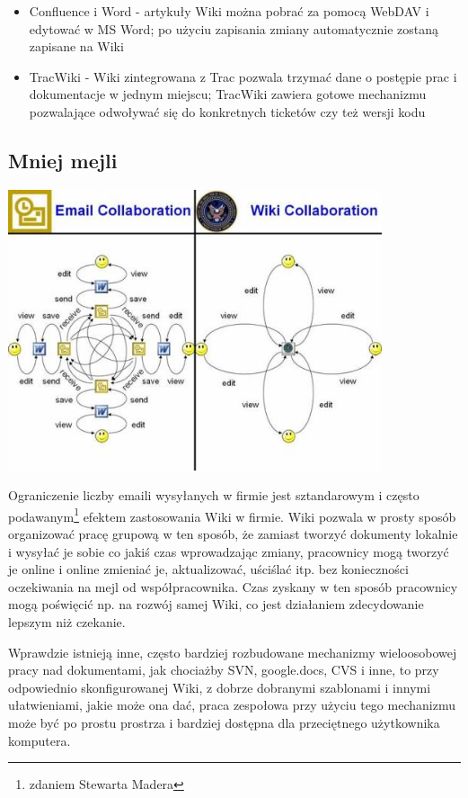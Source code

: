 \documentclass{article}
\begin{document}
\begin{itemize}
\item Confluence i Word - artykuły Wiki można pobrać za pomocą WebDAV i  edytować w MS Word; po użyciu zapisania zmiany automatycznie zostaną zapisane na Wiki
\item TracWiki - Wiki zintegrowana z Trac pozwala trzymać dane o postępie prac i dokumentacje w jednym miejscu; TracWiki zawiera gotowe mechanizmu pozwalające odwoływać się do konkretnych ticketów czy też wersji kodu 

\end{itemize} 



	\subsection{Mniej mejli}
	\begin{center}
		\includegraphics[width=11cm]{screenshots/wiki_collaboration2.jpg}
	\end{center}
		Ograniczenie liczby emaili wysyłanych w firmie jest sztandarowym i często podawanym\footnote{zdaniem Stewarta Madera} efektem zastosowania Wiki w firmie. Wiki pozwala w prosty sposób organizować pracę grupową w ten sposób, że zamiast tworzyć dokumenty lokalnie i wysyłać je sobie co jakiś czas wprowadzając zmiany, pracownicy mogą tworzyć je online i online zmieniać je, aktualizować, uściślać itp. bez konieczności oczekiwania na mejl od współpracownika. Czas zyskany w ten sposób pracownicy mogą poświęcić np. na rozwój samej Wiki, co jest działaniem zdecydowanie lepszym niż czekanie.

		Wprawdzie istnieją inne, często bardziej rozbudowane mechanizmy wieloosobowej pracy nad dokumentami, jak chociażby SVN, google.docs, CVS i inne, to przy odpowiednio skonfigurowanej Wiki, z dobrze dobranymi szablonami i innymi ułatwieniami, jakie może ona dać, praca zespołowa przy użyciu tego mechanizmu może być po prostu prostrza i bardziej dostępna dla przeciętnego użytkownika komputera.
\end{document}
